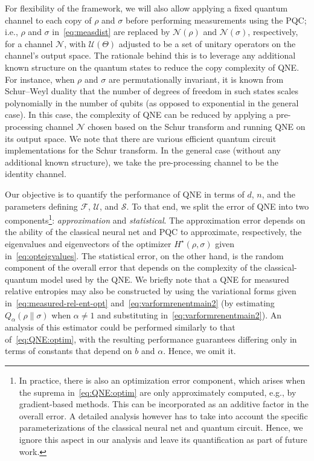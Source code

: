 \documentclass[a4paper,onecolumn,11pt,accepted=2026-05-12]{quantumarticle}
\newcommand{\cF}{\mathcal{F}}
\newcommand{\cN}{\mathcal{N}}
\newcommand{\cS}{\mathcal{S}}
\newcommand{\cU}{\mathcal{U}}
\begin{document}
For flexibility of the framework, we will also allow  applying  a fixed quantum channel to each copy of $\rho$ and $\sigma$ before performing measurements using the PQC; i.e., $\rho$ and $\sigma$ in~\eqref{eq:measdist} are replaced by $\cN(\rho)$ and $\cN(\sigma)$, respectively, for a channel $\cN$, with  $\cU(\Theta)$ adjusted to be a set of unitary operators on the channel's output space. The rationale behind this is to leverage any additional known structure on the quantum states to reduce the copy complexity of QNE.  For instance, when $\rho$ and $\sigma$ are permutationally invariant, it is known from Schur--Weyl duality that the number of degrees of freedom in such states scales polynomially in the number of qubits (as opposed to exponential in the general case). In this case,  the complexity of QNE can be reduced by applying a pre-processing channel $\cN$ chosen based on the Schur transform and running QNE on its output space. We note that there are various efficient quantum circuit implementations \cite{bacon2006quantum,harrow2005applications,Kirby2018schur,Krovi2019efficienthigh} for the Schur transform. In the general case (without any additional known structure), we take the pre-processing channel to be the identity channel.


Our objective is to quantify the performance of QNE in terms of $d$, $n$, and the parameters defining $\cF$, $\cU$, and $\cS$. To that end, we split the error of QNE into two components\footnote{In practice, there is also an optimization error component, which arises when the suprema in~\eqref{eq:QNE:optim} are only approximately computed, e.g., by gradient-based methods. This can be incorporated as an additive factor in the overall error. A detailed analysis however has to take into account the specific parameterizations of the classical neural net and quantum circuit. Hence, we ignore this aspect in our analysis and leave its quantification as part of future work.}: \textit{approximation} and \textit{statistical}. The approximation error depends on the ability of the classical neural net and PQC  to approximate, respectively, the eigenvalues and eigenvectors of the optimizer $H^{\star}(\rho,\sigma)$ given in~\eqref{eq:opteigvalues}. The statistical error, on the other hand,  is the random component of the overall error that depends on the complexity of the classical-quantum model used by the QNE. We briefly note that a QNE  for measured relative entropies may also be constructed by using the variational forms given in~\eqref{eq:measured-rel-ent-opt} and~\eqref{eq:varformrenentmain2} (by estimating $Q_{\alpha}(\rho\|\sigma)$ when $\alpha\neq 1$ and substituting in~\eqref{eq:varformrenentmain2}). An analysis of this estimator could be performed similarly to that of~\eqref{eq:QNE:optim},  with the resulting performance guarantees differing only in  terms of constants that depend on $b$ and $\alpha$. Hence, we omit it. 
\end{document}
